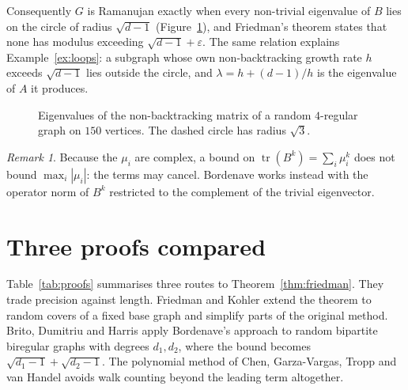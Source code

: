 \documentclass[11pt,letterpaper]{article}
\theoremstyle{definition}
\theoremstyle{remark}
\newtheorem{remark}[theorem]{Remark}
\DeclareMathOperator{\tr}{tr}
\newcommand{\eps}{\varepsilon}
\begin{document}
Consequently $G$ is Ramanujan exactly when every non-trivial eigenvalue of $B$ lies on the circle
of radius $\sqrt{d-1}$ (Figure~\ref{fig:nb}), and Friedman's theorem states that none has modulus
exceeding $\sqrt{d-1}+\eps$. The same relation explains Example~\ref{ex:loops}: a subgraph whose
own non-backtracking growth rate $h$ exceeds $\sqrt{d-1}$ lies outside the circle, and
$\lambda=h+(d-1)/h$ is the eigenvalue of $A$ it produces.

\begin{figure}[ht]
  \centering
  
  \caption{Eigenvalues of the non-backtracking matrix of a random $4$-regular graph on $150$
  vertices. The dashed circle has radius $\sqrt3$.}
  \label{fig:nb}
\end{figure}

\begin{remark}
Because the $\mu_i$ are complex, a bound on $\tr(B^k)=\sum_i\mu_i^k$ does not bound
$\max_i|\mu_i|$: the terms may cancel. Bordenave works instead with the operator norm of $B^k$
restricted to the complement of the trivial eigenvector.
\end{remark}

\section{Three proofs compared}

Table~\ref{tab:proofs} summarises three routes to Theorem~\ref{thm:friedman}. They trade
precision against length. Friedman and Kohler \cite{FK} extend the theorem to random covers of a
fixed base graph and simplify parts of the original method. Brito, Dumitriu and Harris \cite{BDH}
apply Bordenave's approach to random bipartite biregular graphs with degrees $d_1,d_2$, where the
bound becomes $\sqrt{d_1-1}+\sqrt{d_2-1}$. The polynomial method of Chen, Garza-Vargas, Tropp and
van Handel \cite{CGTV} avoids walk counting beyond the leading term altogether.
\end{document}
